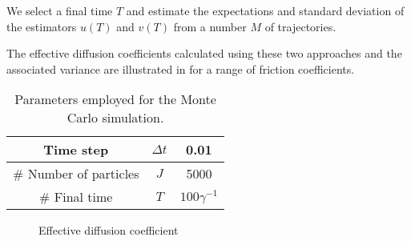 \documentclass[11pt,a4paper]{article}
\theoremstyle{plain}
\numberwithin{equation}{section}
\begin{document}
We select a final time $T$ and estimate the expectations and standard deviation of the estimators $u(T)$ and $v(T)$ from a number $M$ of trajectories.

The effective diffusion coefficients calculated using these two approaches
and the associated variance are illustrated in for a range of friction coefficients.

\begin{table}[ht]
    \centering
    \begin{tabular}{|c|c|c|}
        \hline
        Time step & $\Delta t$ & 0.01 \\
        \hline
        \# Number of particles & $J$ & 5000 \\
        \hline
        \# Final time & $T$ & $100 \gamma^{-1}$ \\
        \hline
    \end{tabular}
    \caption{Parameters employed for the Monte Carlo simulation.}
    \label{table:parameters_employed_for_the_construction_of_the_control_variate}
\end{table}

\begin{figure}[htpb]
    \centering
    \caption{Effective diffusion coefficient}%
    \label{fig:name}
\end{figure}

\end{document}
